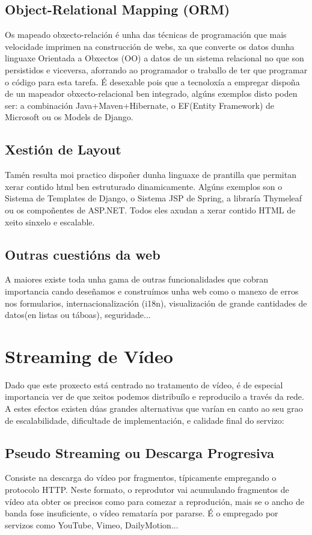 	\subsection{Object-Relational Mapping (ORM)}
		Os mapeado obxecto-relación é unha das técnicas de programación que mais velocidade imprimen
		na construcción de webs, xa que converte os datos dunha linguaxe Orientada a Obxectos (OO) a 
		datos de un sistema relacional no que son persistidos e viceversa, aforrando ao programador
		o traballo de ter que programar o código para esta tarefa. É desexable pois que a tecnoloxía
		a empregar dispoña de un mapeador obxecto-relacional ben integrado, algúns exemplos disto poden
		ser: a combinación Java+Maven+Hibernate, o EF(Entity Framework) de Microsoft ou os Models de Django.
	
	\subsection{Xestión de Layout}
		Tamén resulta moi practico dispoñer dunha linguaxe de prantilla que permitan xerar contido
		html ben estruturado dinamicamente. Algúns exemplos son o Sistema de Templates de Django, o 
		Sistema JSP de Spring, a libraría Thymeleaf ou os compoñentes de ASP.NET. Todos eles axudan 
		a xerar contido HTML de xeito sinxelo e escalable.
		
	\subsection{Outras cuestións da web}
		A maiores existe toda unha gama de outras funcionalidades que cobran importancia cando deseñamos
		e construímos unha web como o manexo de erros nos formularios, internacionalización (i18n), 
		visualización de grande cantidades de datos(en listas ou táboas), seguridade...
		
		
\section{Streaming de Vídeo}
	Dado que este proxecto está centrado no tratamento de vídeo, é de especial importancia ver 
	de que xeitos podemos distribuílo e reproducilo a través da rede. A estes efectos existen dúas
	grandes alternativas que varían en canto ao seu grao de escalabilidade, dificultade de 
	implementación, e calidade final do servizo:
	
	\subsection{Pseudo Streaming ou Descarga Progresiva}
		Consiste na descarga do vídeo por fragmentos, típicamente empregando o protocolo HTTP. 
		Neste formato, o reprodutor vai acumulando fragmentos de vídeo ata obter os precisos como 
		para comezar a reprodución, mais se o ancho de banda fose insuficiente, o vídeo remataría
		por pararse. É o empregado por servizos como YouTube, Vimeo, DailyMotion...
		
